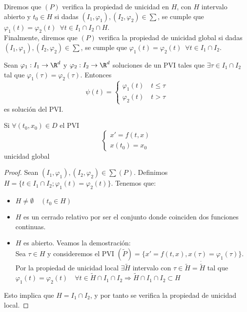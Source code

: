 \documentclass{article}
\begin{document}
Diremos que $(P)$ verifica la propiedad de unicidad en $H$, con $H$ intervalo abierto
y $t_0 \in H$ si dadas $(I_1, \varphi_1), (I_2, \varphi_2) \in \sum$, se cumple que
$\varphi_1(t) = \varphi_2(t)\,\,\, \forall t \in I_1 \cap I_2 \cap H$.\\

Finalmente, diremos que $(P)$ verifica la propiedad de unicidad global si dadas
$(I_1, \varphi_1), (I_2, \varphi_2) \in \sum$, se cumple que $\varphi_1(t) =
\varphi_2(t)\,\,\, \forall t \in I_1 \cap I_2$.\\

\begin{lem}
    Sean $\varphi_1: I_1 \to \R^d$ y $\varphi_2: I_2 \to \R^d$ soluciones de un PVI
    tales que $\exists \tau \in I_1 \cap I_2$ tal que $\varphi_1(\tau) = \varphi_2(\tau)$.
    Entonces
    \[
    \psi(t) = \left\{
    \begin{array}{l}
        \varphi_1(t) \quad t \leq \tau \\
        \varphi_2(t) \quad t > \tau
    \end{array}
    \right.
    \]
    es solución del PVI.
\end{lem}

\begin{lem}
    Si $\forall (t_0, x_0) \in D$ el PVI
    \[
    \left\{
    \begin{array}{l}
        x' = f(t,x) \\
        x(t_0) = x_0
    \end{array}
    \right.
    \]
    unicidad global
\end{lem}

\begin{proof}
    Sean $(I_1, \varphi_1), (I_2, \varphi_2) \in \sum (P)$. Definimos $H = \{ t \in
    I_1 \cap I_2; \varphi_1(t) = \varphi_2(t)\}$. Tenemos que:
    \begin{itemize}
        \item $H \neq \emptyset \quad (t_0 \in H)$
        \item $H$ es un cerrado relativo por ser el conjunto donde coinciden dos
        funciones continuas.
        \item $H$ es abierto. Veamos la demostración:\\
        Sea $\tau \in H$ y consideremos el PVI $(\tilde{P})=\{x'= f(t, x), x(\tau)
        = \varphi_1(\tau)\}$. Por la propiedad de unicidad local $\exists \tilde{H}$
        intervalo con $\tau \in \tilde{H} = \dot{\tilde{H}}$ tal que $\varphi_1(t) =
        \varphi_2(t) \quad \forall t \in \tilde{H} \cap I_1 \cap I_2 \Rightarrow
        \tilde{H} \cap I_1 \cap I_2 \subset H$
    \end{itemize}
    Esto implica que $H = I_1 \cap I_2$, y por tanto se verifica la propiedad de
    unicidad local.
\end{proof}
\end{document}
